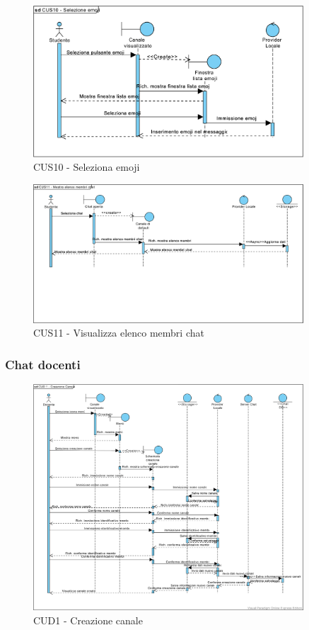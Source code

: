 \begin{figure}
	\centering
	\includegraphics[width=0.9\textwidth]{imgs/gruppo6/sequence/CUS10_selezione_emoji.pdf}
	\caption{CUS10 - Seleziona emoji}
	\label{fig:seq-cus10}
\end{figure}

\begin{figure}
	\centering
	\includegraphics[width=0.9\textwidth]{imgs/gruppo6/sequence/CUS11_visualizza_elenco_membri_chat.pdf}
	\caption{CUS11 - Visualizza elenco membri chat}
	\label{fig:seq-cus11}
\end{figure}

\pagebreak
\subsubsection{Chat docenti}
\begin{figure}
	\centering
	\includegraphics[width=0.9\textwidth]{imgs/gruppo6/sequence/CUD1_creazione_canale.pdf}
	\caption{CUD1 - Creazione canale}
	\label{fig:seq-cud1}
\end{figure}


